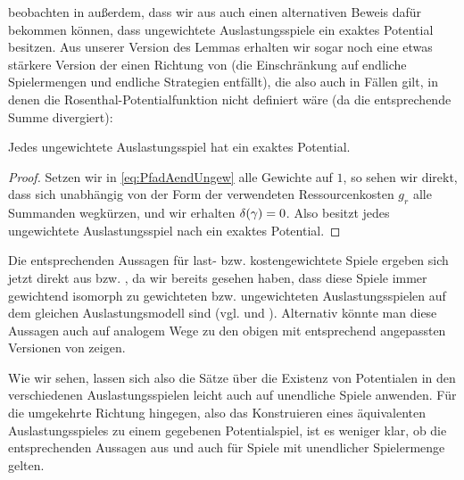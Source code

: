 \citeauthor{CharExGewPotinWCG} beobachten in \cite{CharExGewPotinWCG} außerdem, dass wir aus  auch einen alternativen Beweis dafür bekommen können, dass ungewichtete Auslastungsspiele ein exaktes Potential besitzen. Aus unserer Version des Lemmas erhalten wir sogar noch eine etwas stärkere Version der einen Richtung von  (die Einschränkung auf endliche Spielermengen und endliche Strategien entfällt), die also auch in Fällen gilt, in denen die Rosenthal-Potentialfunktion nicht definiert wäre (da die entsprechende Summe divergiert):

\begin{kor}\label{kor:MondererShapleyUnendl}
	Jedes ungewichtete Auslastungsspiel hat ein exaktes Potential.
\end{kor}

\begin{proof}
	Setzen wir in \eqref{eq:PfadAendUngew} alle Gewichte auf $1$, so sehen wir direkt, dass sich unabhängig von der Form der verwendeten Ressourcenkosten $g_r$ alle Summanden wegkürzen, und wir erhalten $\delta(\gamma) = 0$. Also besitzt jedes ungewichtete Auslastungsspiel nach  ein exaktes Potential.
\end{proof}

\begin{bem}\label{bem:UnendlLastKostGewAusl}
	Die entsprechenden Aussagen für last- bzw. kostengewichtete Spiele ergeben sich jetzt direkt aus  bzw. , da wir bereits gesehen haben, dass diese Spiele immer gewichtend isomorph zu gewichteten bzw. ungewichteten Auslastungsspielen auf dem gleichen Auslastungsmodell sind (vgl.  und ). Alternativ könnte man diese Aussagen auch auf analogem Wege zu den obigen mit entsprechend angepassten Versionen von  zeigen.
\end{bem}

Wie wir sehen, lassen sich also die Sätze über die Existenz von Potentialen in den verschiedenen Auslastungsspielen leicht auch auf unendliche Spiele anwenden. Für die umgekehrte Richtung hingegen, also das Konstruieren eines äquivalenten Auslastungsspieles zu einem gegebenen Potentialspiel, ist es weniger klar, ob die entsprechenden Aussagen aus  und  auch für Spiele mit unendlicher Spielermenge gelten. 

